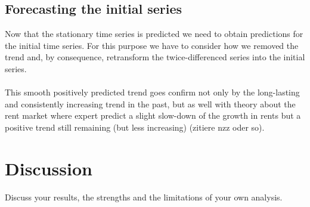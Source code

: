 \documentclass[11pt,a4paper]{article}
\begin{document}
\subsection{Forecasting the initial series}
Now that the stationary time series is predicted we need to obtain predictions for the initial time series. For this purpose we have to consider how we removed the trend and, by consequence, retransform the twice-differenced series into the initial series. 
\\
\\
This smooth positively predicted trend goes confirm not only by the long-lasting and consistently increasing trend in the past, but as well with theory about the rent market where expert predict a slight slow-down of the growth in rents but a positive trend still remaining (but less increasing) (zitiere nzz oder so).




\section{Discussion}
Discuss your results, the strengths and the limitations of your own analysis. 
\end{document}
